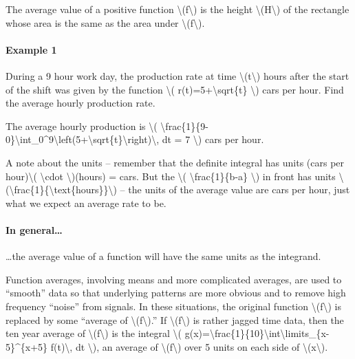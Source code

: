 The average value of a positive function
\textbackslash{}(f\textbackslash{}) is the height
\textbackslash{}(H\textbackslash{}) of the rectangle whose area is the
same as the area under \textbackslash{}(f\textbackslash{}).

\hypertarget{example-1}{%
\paragraph{Example 1}\label{example-1}}

During a 9 hour work day, the production rate at time
\textbackslash{}(t\textbackslash{}) hours after the start of the shift
was given by the function \textbackslash{}(
r(t)=5+\textbackslash{}sqrt\{t\} \textbackslash{}) cars per hour. Find
the average hourly production rate.

The average hourly production is \textbackslash{}(
\textbackslash{}frac\{1\}\{9-0\}\textbackslash{}int\_0\^{}9\textbackslash{}left(5+\textbackslash{}sqrt\{t\}\textbackslash{}right)\textbackslash{},
dt = 7 \textbackslash{}) cars per hour.

A note about the units -- remember that the definite integral has units
(cars per hour)\textbackslash{}( \textbackslash{}cdot
\textbackslash{})(hours) = cars. But the \textbackslash{}(
\textbackslash{}frac\{1\}\{b-a\} \textbackslash{}) in front has units
\textbackslash{}(\textbackslash{}frac\{1\}\{\textbackslash{}text\{hours\}\}\textbackslash{})
-- the units of the average value are cars per hour, just what we expect
an average rate to be.

\hypertarget{in-general}{%
\paragraph{In general\ldots{}}\label{in-general}}

\ldots{}the average value of a function will have the same units as the
integrand.

Function averages, involving means and more complicated averages, are
used to ``smooth'' data so that underlying patterns are more obvious and
to remove high frequency ``noise'' from signals. In these situations,
the original function \textbackslash{}(f\textbackslash{}) is replaced by
some ``average of \textbackslash{}(f\textbackslash{}).'' If
\textbackslash{}(f\textbackslash{}) is rather jagged time data, then the
ten year average of \textbackslash{}(f\textbackslash{}) is the integral
\textbackslash{}(
g(x)=\textbackslash{}frac\{1\}\{10\}\textbackslash{}int\textbackslash{}limits\_\{x-5\}\^{}\{x+5\}
f(t)\textbackslash{}, dt \textbackslash{}), an average of
\textbackslash{}(f\textbackslash{}) over 5 units on each side of
\textbackslash{}(x\textbackslash{}).

